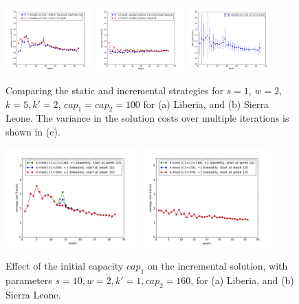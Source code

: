 \begin{figure}[h]
  \centering %
    \includegraphics[width=0.30\textwidth]{figs/plot_kmed_CAP100.png}
    \includegraphics[width=0.30\textwidth]{figs/plot_kmed_CAP100_SL.png}
    \includegraphics[width=0.3\textwidth]{figs/plot_online_cap100.png}
    \caption{Comparing the static and incremental strategies for
$s=1$, $w=2$, $k=5, k' = 2$, $cap_1 = cap_2 = 100$ for
(a) Liberia, and (b) Sierra Leone.
The variance in the solution costs over multiple iterations is shown in (c).}
\label{fig:online1}
\end{figure}

\begin{figure}[h]
  \centering %
    \includegraphics[width=0.45\textwidth]{figs/plot_kmed_c1.png}
    \includegraphics[width=0.45\textwidth]{figs/plot_kmed_c1c2_SL.png}
    \caption{Effect of the initial capacity $cap_1$ on the incremental solution, with
parameters $s = 10, w = 2, k' = 1, cap_2 = 160$, for (a) Liberia, and (b) Sierra Leone.}
\label{fig:online2}
\end{figure}

